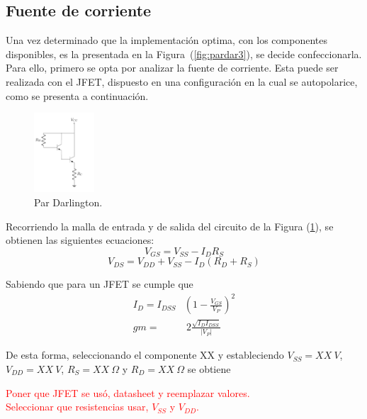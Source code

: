 \subsection{Fuente de corriente}
\label{subsec:fdei}
Una vez determinado que la implementación optima, con los componentes disponibles, es la presentada en la Figura~(\ref{fig:pardar3}), se decide confeccionarla. Para ello, primero se opta por analizar la fuente de corriente. Esta puede ser realizada con el JFET, dispuesto en una configuración en la cual se autopolarice, como se presenta a continuación.
\begin{figure}[H]
\centering
	\includegraphics[width=0.2\textwidth, page=4]{Imagenes/ParDarlington.pdf}
	\caption{Par Darlington.}
	\label{fig:fuentei}
\end{figure}

Recorriendo la malla de entrada y de salida del circuito de la Figura (\ref{fig:fuentei}), se obtienen las siguientes ecuaciones:
\begin{equation}
	V_{GS} = V_{SS} - I_{D} R_{S}
\end{equation}
\begin{equation}
	V_{DS} = V_{DD} + V_{SS} - I_{D} \left( R_{D} + R_{S} \right)
\end{equation}

Sabiendo que para un JFET se cumple que
\begin{equation}
\begin{split}
	I_D = I_{DSS} & \left( 1 - \frac{V_{GS}}{V_P} \right)^2 \\
	gm = & \ 2\frac{\sqrt{I_D I_{DSS}}}{|V_P|}
\end{split}
\end{equation}

De esta forma, seleccionando el componente XX %
y estableciendo $V_{SS} = XX \ V$, $V_{DD} = XX \ V$, $R_S = XX \ \Omega$ y $R_D = XX \ \Omega$ se obtiene
\begin{center}
	\LARGE{\textcolor{red}{Poner que JFET se usó, datasheet y reemplazar valores.}} \\
	\LARGE{\textcolor{red}{Seleccionar que resistencias usar, $V_{SS}$ y $V_{DD}$.}}
\end{center}

